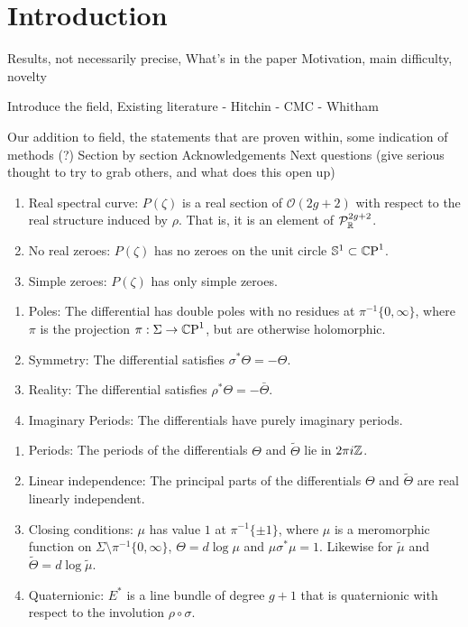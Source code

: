\documentclass{article}
\begin{document}
\section{Introduction}
\label{sec:Introduction}

Results, not necessarily precise, What's in the paper
Motivation, main difficulty, novelty

Introduce the field, Existing literature
- Hitchin
- CMC
- Whitham

Our addition to field, the statements that are proven within, some indication of methods (?)
Section by section
Acknowledgements
Next questions (give serious thought to try to grab others, and what does this open up)

\begin{enumerate}[label=(P.\arabic*)]
\item\label{P:real curve} Real spectral curve: $P(\zeta)$ is a real section of $\mathcal{O}(2g+2)$ with respect to the real structure induced by $\rho$. That is, it is an element of $\mathcal{P}^{2g+2}_{\mathbb{R}}$.
\item\label{P:no real zeroes} No real zeroes: $P(\zeta)$ has no zeroes on the unit circle $\mathbb{S}^1\subset\mathbb{C}\text{P}^1$.
\item\label{P:simple zeroes} Simple zeroes: $P(\zeta)$ has only simple zeroes.
\end{enumerate}
\begin{enumerate}[resume*]
\item\label{P:poles} Poles: The differential has double poles with no residues at $\pi^{-1}\{0,\infty\}$, where $\pi$ is the projection $\pi: \Sigma \to \mathbb{C}\text{P}^1$, but are otherwise holomorphic.
\item\label{P:symmetry} Symmetry: The differential satisfies $\sigma^* \Theta = - \Theta$.
\item\label{P:reality} Reality: The differential satisfies $\rho^* \Theta = - \bar{\Theta}$.
\item\label{P:imaginary periods} Imaginary Periods: The differentials have purely imaginary periods.
\end{enumerate}
\begin{enumerate}[resume*]
\item\label{P:periods} Periods: The periods of the differentials $\Theta$ and $\tilde{\Theta}$ lie in $2\pi i\mathbb{Z}$.
\item\label{P:linear independence} Linear independence: The principal parts of the differentials $\Theta$ and $\tilde{\Theta}$ are real linearly independent.
\item\label{P:closing} Closing conditions: $\mu$ has value $1$ at $\pi^{-1}\{\pm 1\}$, where $\mu$ is a meromorphic function on $\Sigma\setminus \pi^{-1}\{0,\infty\}$, $\Theta = d\log \mu$ and $\mu\sigma^*\mu = 1$. Likewise for $\tilde{\mu}$ and $\tilde{\Theta}=d\log \tilde{\mu}$.
\item\label{P:quaternionic} Quaternionic: $E^*$ is a line bundle of degree $g+1$ that is quaternionic with respect to the involution $\rho \circ \sigma$.
\end{enumerate}
\end{document}
